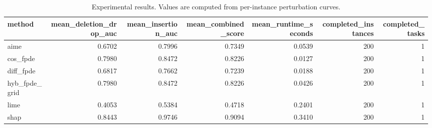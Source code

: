 \begin{table}[t]
\caption{Experimental results. Values are computed from per-instance perturbation curves.}
\label{tab:main_results_computed}
\centering
\begin{tabular}{lrrrrrr}
\toprule
method & mean\_deletion\_drop\_auc & mean\_insertion\_auc & mean\_combined\_score & mean\_runtime\_seconds & completed\_instances & completed\_tasks \\
\midrule
aime & 0.6702 & 0.7996 & 0.7349 & 0.0539 & 200 & 1 \\
cos\_fpde & 0.7980 & 0.8472 & 0.8226 & 0.0127 & 200 & 1 \\
diff\_fpde & 0.6817 & 0.7662 & 0.7239 & 0.0188 & 200 & 1 \\
hyb\_fpde\_grid & 0.7980 & 0.8472 & 0.8226 & 0.0426 & 200 & 1 \\
lime & 0.4053 & 0.5384 & 0.4718 & 0.2401 & 200 & 1 \\
shap & 0.8443 & 0.9746 & 0.9094 & 0.3410 & 200 & 1 \\
\bottomrule
\end{tabular}

\end{table}
